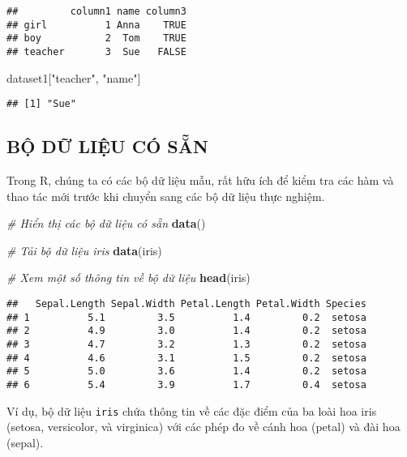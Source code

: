\documentclass[
]{article}
\newenvironment{Shaded}{\begin{snugshade}}{\end{snugshade}}
\newcommand{\CommentTok}[1]{\textcolor[rgb]{0.56,0.35,0.01}{\textit{#1}}}
\newcommand{\FunctionTok}[1]{\textcolor[rgb]{0.13,0.29,0.53}{\textbf{#1}}}
\newcommand{\NormalTok}[1]{#1}
\newcommand{\StringTok}[1]{\textcolor[rgb]{0.31,0.60,0.02}{#1}}
\begin{document}
\begin{verbatim}
##         column1 name column3
## girl          1 Anna    TRUE
## boy           2  Tom    TRUE
## teacher       3  Sue   FALSE
\end{verbatim}

\begin{Shaded}
\begin{Highlighting}[]
\NormalTok{dataset1[}\StringTok{"teacher"}\NormalTok{, }\StringTok{"name"}\NormalTok{]}
\end{Highlighting}
\end{Shaded}

\begin{verbatim}
## [1] "Sue"
\end{verbatim}

\subsection{BỘ DỮ LIỆU CÓ
SẴN}\label{bux1ed9-dux1eef-liux1ec7u-cuxf3-sux1eb5n}

Trong R, chúng ta có các bộ dữ liệu mẫu, rất hữu ích để kiểm tra các hàm
và thao tác mới trước khi chuyển sang các bộ dữ liệu thực nghiệm.

\begin{Shaded}
\begin{Highlighting}[]
\CommentTok{\# Hiển thị các bộ dữ liệu có sẵn}
\FunctionTok{data}\NormalTok{()}

\CommentTok{\# Tải bộ dữ liệu iris}
\FunctionTok{data}\NormalTok{(iris)}

\CommentTok{\# Xem một số thông tin về bộ dữ liệu}
\FunctionTok{head}\NormalTok{(iris)}
\end{Highlighting}
\end{Shaded}

\begin{verbatim}
##   Sepal.Length Sepal.Width Petal.Length Petal.Width Species
## 1          5.1         3.5          1.4         0.2  setosa
## 2          4.9         3.0          1.4         0.2  setosa
## 3          4.7         3.2          1.3         0.2  setosa
## 4          4.6         3.1          1.5         0.2  setosa
## 5          5.0         3.6          1.4         0.2  setosa
## 6          5.4         3.9          1.7         0.4  setosa
\end{verbatim}

Ví dụ, bộ dữ liệu \texttt{iris} chứa thông tin về các đặc điểm của ba
loài hoa iris (setosa, versicolor, và virginica) với các phép đo về cánh
hoa (petal) và đài hoa (sepal).
\end{document}
